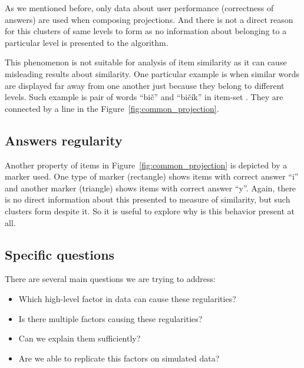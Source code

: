 \documentclass[
  print, %
  table,   %
  nolof,     %
  nolot,     %
  nocover,
  color,
  final,
]{fithesis3}
\begin{document}
As we mentioned before, only data about user performance (correctness of answers) are used when composing projections. And there is not a direct reason for this clusters of same levels to form as no information about belonging to a particular level is presented to the algorithm.


This phenomenon is not suitable for analysis of item similarity as it can cause misleading results about similarity. One particular example is when similar words are displayed far away from one another just because they belong to different levels. Such example is pair of words ``bič'' and ``bičík'' in item-set \cviceniB{}. They are connected by a line in the Figure~\ref{fig:common_projection}.


\subsection{Answers regularity}\label{answers-regularity}

Another property of items in Figure~\ref{fig:common_projection} is depicted by a marker used. One type of marker (rectangle) shows items with correct answer ``i'' and another marker (triangle) shows items with correct answer ``y''. Again, there is no direct information about this presented to measure of similarity, but such clusters form despite it. So it is useful to explore why is this behavior present at all.


\subsection{Specific questions}\label{specific-questions}

There are several main questions we are trying to address:

\begin{itemize}
 \item Which high-level factor in data can cause these regularities?
 \item Is there multiple factors causing these regularities?
 \item Can we explain them sufficiently?
 \item Are we able to replicate this factors on simulated data?
\end{itemize}
\end{document}
